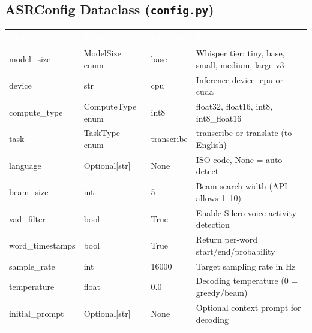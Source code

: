 \documentclass[11pt,a4paper]{article}
\newcommand{\thc}[1]{\textcolor{white}{\bfseries #1}}
\newcommand{\headrow}{\rowcolor{headblue}}
\begin{document}
\subsection{ASRConfig Dataclass (\texttt{config.py})}
\begin{tabularx}{\textwidth}{|L{3.2cm}|L{2.6cm}|L{2.4cm}|Y|}
\hline
\headrow \thc{Field} & \thc{Type} & \thc{Default} & \thc{Description} \\ \hline
model\_size & ModelSize enum & base & Whisper tier: tiny, base, small, medium, large-v3 \\ \hline
device & str & cpu & Inference device: cpu or cuda \\ \hline
compute\_type & ComputeType enum & int8 & float32, float16, int8, int8\_float16 \\ \hline
task & TaskType enum & transcribe & transcribe or translate (to English) \\ \hline
language & Optional[str] & None & ISO code, None = auto-detect \\ \hline
beam\_size & int & 5 & Beam search width (API allows 1--10) \\ \hline
vad\_filter & bool & True & Enable Silero voice activity detection \\ \hline
word\_timestamps & bool & True & Return per-word start/end/probability \\ \hline
sample\_rate & int & 16000 & Target sampling rate in Hz \\ \hline
temperature & float & 0.0 & Decoding temperature (0 = greedy/beam) \\ \hline
initial\_prompt & Optional[str] & None & Optional context prompt for decoding \\ \hline
\end{tabularx}
\end{document}
